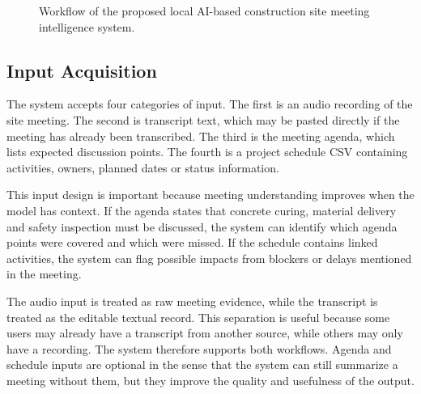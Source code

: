 \documentclass[11pt,a4paper]{article}
\begin{document}
\begin{figure}[H]
\centering
{}
\caption{Workflow of the proposed local AI-based construction site meeting intelligence system.}
\end{figure}

\subsection{Input Acquisition}

The system accepts four categories of input. The first is an audio recording of the site meeting. The second is transcript text, which may be pasted directly if the meeting has already been transcribed. The third is the meeting agenda, which lists expected discussion points. The fourth is a project schedule CSV containing activities, owners, planned dates or status information.

This input design is important because meeting understanding improves when the model has context. If the agenda states that concrete curing, material delivery and safety inspection must be discussed, the system can identify which agenda points were covered and which were missed. If the schedule contains linked activities, the system can flag possible impacts from blockers or delays mentioned in the meeting.

The audio input is treated as raw meeting evidence, while the transcript is treated as the editable textual record. This separation is useful because some users may already have a transcript from another source, while others may only have a recording. The system therefore supports both workflows. Agenda and schedule inputs are optional in the sense that the system can still summarize a meeting without them, but they improve the quality and usefulness of the output.
\end{document}
